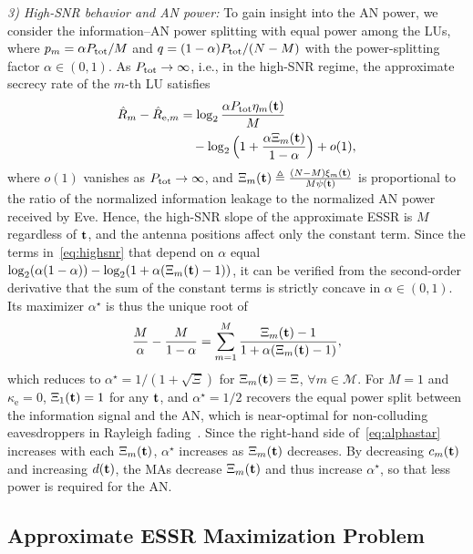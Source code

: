 \documentclass[journal]{IEEEtran}
\begin{document}
\textit{3) High-SNR behavior and AN power:} To gain insight into the AN power, we consider the information--AN power splitting with equal power among the LUs, where $p_m=\alpha P_{\mathrm{tot}}/M$ and $q=(1-\alpha)P_{\mathrm{tot}}/(N-M)$ with the power-splitting factor $\alpha\in(0,1)$. As $P_{\mathrm{tot}}\to\infty$, i.e., in the high-SNR regime, the approximate secrecy rate of the $m$-th LU satisfies
\begin{align}
\hat R_m-\hat R_{\mathrm{e},m}&=\log_2\frac{\alpha P_{\mathrm{tot}}\eta_m(\mathbf{t})}{M}\nonumber\\
&\quad-\log_2\Big(1+\frac{\alpha\Xi_m(\mathbf{t})}{1-\alpha}\Big)+o(1),\label{eq:highsnr}
\end{align}
where $o(1)$ vanishes as $P_{\mathrm{tot}}\to\infty$, and $\Xi_m(\mathbf{t})\triangleq\frac{(N-M)\xi_m(\mathbf{t})}{M\psi(\mathbf{t})}$ is proportional to the ratio of the normalized information leakage to the normalized AN power received by Eve. Hence, the high-SNR slope of the approximate ESSR is $M$ regardless of $\mathbf{t}$, and the antenna positions affect only the constant term. Since the terms in~\eqref{eq:highsnr} that depend on $\alpha$ equal $\log_2(\alpha(1-\alpha))-\log_2(1+\alpha(\Xi_m(\mathbf{t})-1))$, it can be verified from the second-order derivative that the sum of the constant terms is strictly concave in $\alpha\in(0,1)$. Its maximizer $\alpha^\star$ is thus the unique root of
\begin{equation}\label{eq:alphastar}
\frac{M}{\alpha}-\frac{M}{1-\alpha}=\sum_{m=1}^{M}\frac{\Xi_m(\mathbf{t})-1}{1+\alpha(\Xi_m(\mathbf{t})-1)},
\end{equation}
which reduces to $\alpha^\star=1/(1+\sqrt{\Xi})$ for $\Xi_m(\mathbf{t})=\Xi$, $\forall m\in\mathcal M$. For $M=1$ and $\kappa_{\mathrm e}=0$, $\Xi_1(\mathbf{t})=1$ for any $\mathbf{t}$, and $\alpha^\star=1/2$ recovers the equal power split between the information signal and the AN, which is near-optimal for non-colluding eavesdroppers in Rayleigh fading~\cite{Zhou2010}. Since the right-hand side of~\eqref{eq:alphastar} increases with each $\Xi_m(\mathbf{t})$, $\alpha^\star$ increases as $\Xi_m(\mathbf{t})$ decreases. By decreasing $c_m(\mathbf{t})$ and increasing $d(\mathbf{t})$, the MAs decrease $\Xi_m(\mathbf{t})$ and thus increase $\alpha^\star$, so that less power is required for the AN.

\subsection{Approximate ESSR Maximization Problem}\label{sec:discussion}
\end{document}
